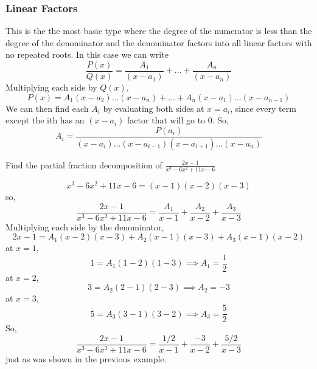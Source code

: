 \subsubsection{Linear Factors}
\noindent
This is the the most basic type where the degree of the numerator is less than the degree of the denominator and the denominator factors into all linear factors with no repeated roots. In this case we can write
\begin{equation*}
	\frac{P(x)}{Q(x)} = \frac{A_1}{(x-a_1)} + \ldots + \frac{A_n}{(x-a_n)}
\end{equation*}
Multiplying each side by $Q(x)$,
\begin{equation*}
	P(x) = A_1(x-a_2) \ldots (x-a_n) + \ldots + A_n(x-a_1) \ldots (x-a_{n-1})
\end{equation*}
We can then find each $A_i$ by evaluating both sides at $x=a_i$, since every term except the ith has an $(x-a_i)$ factor that will go to 0. So,
\begin{equation*}
	A_i = \frac{P(a_i)}{(x-a_i) \ldots (x-a_{i-1})(x-a_{i+1}) \ldots (x-a_n)}
\end{equation*}

\begin{example}
	Find the partial fraction decomposition of $\frac{2x-1}{x^3-6x^2+11x-6}$
\end{example}
\begin{equation*}
	x^3-6x^2+11x-6 = (x-1)(x-2)(x-3)
\end{equation*}
so,
\begin{equation*}
	\frac{2x-1}{x^3-6x^2+11x-6} = \frac{A_1}{x-1}+\frac{A_2}{x-2}+\frac{A_3}{x-3}
\end{equation*}
Multiplying each side by the denominator,
\begin{equation*}
	2x-1 = A_1(x-2)(x-3)+A_2(x-1)(x-3)+A_3(x-1)(x-2)
\end{equation*}
at $x=1$,
\begin{equation*}
	1 = A_1(1-2)(1-3) \implies A_1 = \frac{1}{2}
\end{equation*}
at $x=2$,
\begin{equation*}
	3 = A_2(2-1)(2-3) \implies A_2 = -3
\end{equation*}
at $x=3$,
\begin{equation*}
	5 = A_3(3-1)(3-2) \implies A_3 = \frac{5}{2}
\end{equation*}
So,
\begin{equation*}
	\frac{2x-1}{x^3-6x^2+11x-6} = \frac{1/2}{x-1} + \frac{-3}{x-2} + \frac{5/2}{x-3}
\end{equation*}
just as was shown in the previous example.